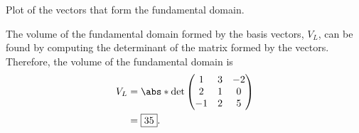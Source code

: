\documentclass[
  coursecode={MTHE 418},
  assignmentname={Homework \homeworknumber},
  studentnumber=20053722,
  name={Bryan Hoang},
  draft,
]{
  ltxanswer%
}
\begin{document}
  \begin{questions}
    \setcounter{question}{\questionnumber}
    \addtocounter{question}{-1}
    \question[10]
    \begin{solution}
      \begin{answerfigure}
        \caption{Plot of the vectors that form the fundamental domain.}
      \end{answerfigure}
      The volume of the fundamental domain formed by the basis vectors, \(V_{L}\), can be found by computing the determinant of the matrix formed by the vectors. Therefore, the volume of the fundamental domain is
      \begin{align*}
        V_{L} &= \abs*{\det\begin{pmatrix}
                               1  & 3 & -2 \\
                               2  & 1 & 0  \\
                               -1 & 2 & 5
                             \end{pmatrix}} \\
              &= \boxed{35}.
      \end{align*}
    \end{solution}
  \end{questions}
\end{document}
